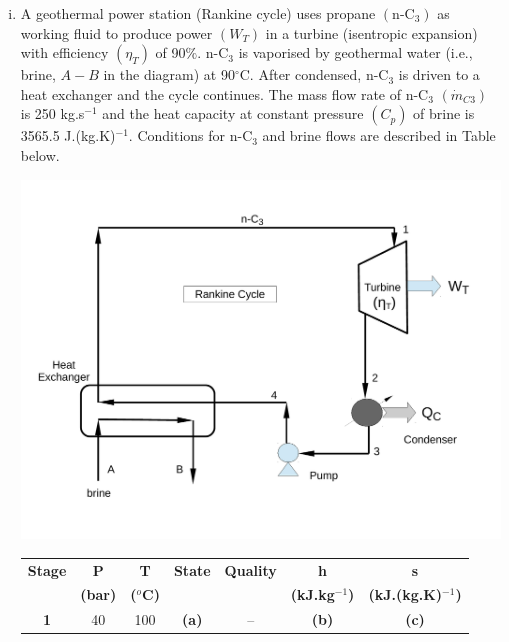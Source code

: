 \documentclass[calculator,steamtables,refrigeranttables,psychrometricchart,datasheet]{exam}
\begin{document}
\begin{question}
%
\begin{enumerate}[(i)]
\item  A geothermal power station (Rankine cycle) uses propane $\left(\text{n-C}_{3}\right)$ as working fluid to produce power $\left(W_{T}\right)$ in a turbine (isentropic expansion) with efficiency $\left(\eta_{T}\right)$ of 90$\%$. n-C$_{3}$ is vaporised by geothermal water (i.e., brine, $A-B$ in the diagram) at 90$^{\circ}$C. After condensed, n-C$_{3}$ is driven to a heat exchanger and the cycle continues. The mass flow rate of n-C$_{3}$ $\left(\dot{m}_{C3}\right)$ is 250 kg.s$^{-1}$ and the heat capacity at constant pressure $\left(C_{p}\right)$ of brine is 3565.5 J.(kg.K)$^{-1}$. Conditions for n-C$_{3}$ and brine flows are described in Table below.
\begin{center}
\includegraphics[width=10.cm,height=7.cm,clip]{./Pics/RankineCycle}
\end{center}
\begin{center}
\begin{tabular} {||c | c c c c c c || }
\hline\hline
{\bf Stage} & {\bf P}    & {\bf T}        & {\bf State}    &  {\bf Quality }     &  {\bf h}             & {\bf s}                  \\
            & {\bf (bar)}& {\bf ($^{o}$C)} &               &                     & {\bf (kJ.kg$^{-1}$)}  & {\bf (kJ.(kg.K)$^{-1}$)}  \\
\hline\hline
 {\bf 1 }   & 40         & 100            &   {\bf (a)}    &    --               & {\bf (b)}           & {\bf (c)}                \\

\end{tabular}
\end{center}
\end{enumerate}
\end{question}
\end{document}
